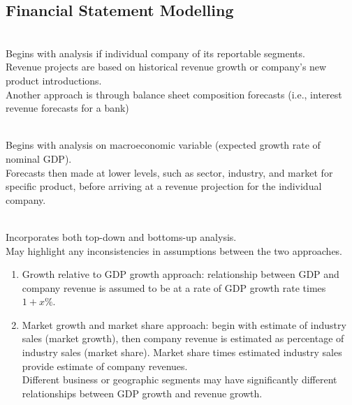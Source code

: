 \subsection{Financial Statement Modelling}

\begin{definition} \\
Begins with analysis if individual company of its reportable segments.\\
Revenue projects are based on historical revenue growth or company's new product introductions.\\
Another approach is through balance sheet composition forecasts (i.e., interest revenue forecasts for a bank) 
\end{definition}

\begin{definition}  \\
Begins with analysis on macroeconomic variable (expected growth rate of nominal GDP).\\
Forecasts then made at lower levels, such as sector, industry, and market for specific product, before arriving at a revenue projection for the individual company.
\end{definition}

\begin{definition} \\
Incorporates both top-down and bottoms-up analysis.\\
May highlight any inconsistencies in assumptions between the two approaches.
\end{definition}

\begin{method} 
\begin{enumerate}[label=\roman*.]
\setlength{\itemsep}{0pt}
\item Growth relative to GDP growth approach: relationship between GDP and company revenue is assumed to be at a rate of GDP growth rate times $1 + x\%$.
\item Market growth and market share approach: begin with estimate of industry sales (market growth), then company revenue is estimated as percentage of industry sales (market share). Market share times estimated industry sales provide estimate of company revenues.\\
Different business or geographic segments may have significantly different relationships between GDP growth and revenue growth.
\end{enumerate}
\end{method}

